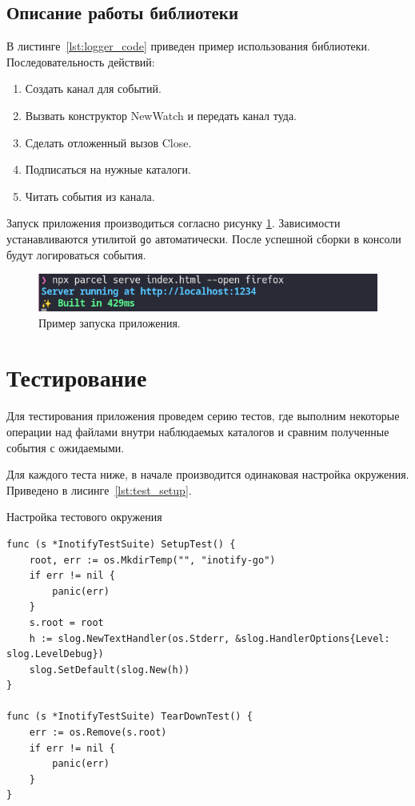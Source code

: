 \documentclass[14pt, russian]{scrartcl}
\newcommand{\code}[1]{\texttt{#1}}
\begin{document}
\subsection{Описание работы библиотеки}

В листинге~\ref{lst:logger_code} приведен пример использования библиотеки. Последовательность действий:

\begin{enumerate}
  \item Создать канал для событий.
  \item Вызвать конструктор NewWatch и передать канал туда.
  \item Сделать отложенный вызов Close.
  \item Подписаться на нужные каталоги.
  \item Читать события из канала.
\end{enumerate}

Запуск приложения производиться согласно рисунку \ref{fig:run_app}. Зависимости
устанавливаются утилитой \code{go} автоматически. После успешной сборки в
консоли будут логироваться события.

\begin{figure}[H]
	\centering
	\begin{minipage}[t]{.8\textwidth}
		\centering
		\includegraphics[width=.8\textwidth]{./imgs/run_app.png}
	\end{minipage}
	\caption{Пример запуска приложения.}
	\label{fig:run_app}
\end{figure}

\section{Тестирование}

Для тестирования приложения проведем серию тестов, где выполним некоторые
операции над файлами внутри наблюдаемых каталогов и сравним полученные события с
ожидаемыми.

Для каждого теста ниже, в начале производится одинаковая настройка окружения.
Приведено в лисинге~\ref{lst:test_setup}.

\begin{listing}[H]
\caption{Настройка тестового окружения}
\label{lst:test_setup}
\begin{verbatim}
func (s *InotifyTestSuite) SetupTest() {
	root, err := os.MkdirTemp("", "inotify-go")
	if err != nil {
		panic(err)
	}
	s.root = root
	h := slog.NewTextHandler(os.Stderr, &slog.HandlerOptions{Level: slog.LevelDebug})
	slog.SetDefault(slog.New(h))
}

func (s *InotifyTestSuite) TearDownTest() {
	err := os.Remove(s.root)
	if err != nil {
		panic(err)
	}
}
\end{verbatim}
\end{listing}
\end{document}
